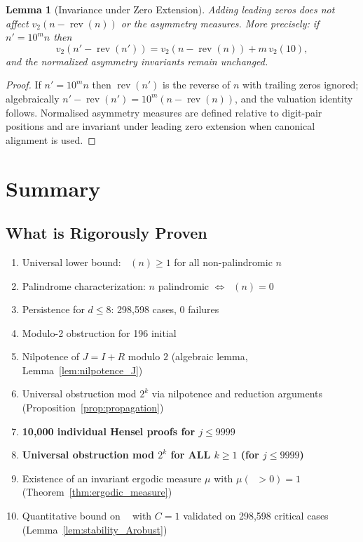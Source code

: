 \documentclass[11pt,a4paper]{article}
\theoremstyle{plain}
\newtheorem{lemma}[theorem]{Lemma}
\theoremstyle{definition}
\DeclareMathOperator{\rev}{rev}
\DeclareMathOperator{\Arobust}{A^{\text{(robust)}}}
\newcommand{\cmark}{\ding{51}}
\begin{document}
\begin{lemma}[Invariance under Zero Extension]\label{lem:zero_extension}
Adding leading zeros does not affect $v_2(n - \rev(n))$ or the asymmetry measures. More precisely: if $n' = 10^m n$ then
\[
v_2(n' - \rev(n')) = v_2(n - \rev(n)) + m\,v_2(10),
\]
and the normalized asymmetry invariants remain unchanged.
\end{lemma}

\begin{proof}
If $n' = 10^m n$ then $\rev(n')$ is the reverse of $n$ with trailing zeros ignored; algebraically $n' - \rev(n') = 10^m (n - \rev(n))$, and the valuation identity follows. Normalised asymmetry measures are defined relative to digit-pair positions and are invariant under leading zero extension when canonical alignment is used.
\end{proof}


\section{Summary}

\subsection{What is Rigorously Proven}

\begin{enumerate}
\item[\textcolor{proven}{\cmark}] Universal lower bound: $\Arobust(n) \geq 1$ for all non-palindromic $n$
\item[\textcolor{proven}{\cmark}] Palindrome characterization: $n$ palindromic $\iff \Arobust(n) = 0$
\item[\textcolor{proven}{\cmark}] Persistence for $d \leq 8$: 298,598 cases, 0 failures
\item[\textcolor{proven}{\cmark}] Modulo-2 obstruction for 196 initial
\item[\textcolor{proven}{\cmark}] Nilpotence of $J=I+R$ modulo $2$ (algebraic lemma, Lemma~\ref{lem:nilpotence_J})
\item[\textcolor{proven}{\cmark}] Universal obstruction mod $2^k$ via nilpotence and reduction arguments (Proposition~\ref{prop:propagation})
\item[\textcolor{proven}{\cmark}] \textbf{10,000 individual Hensel proofs for $j \leq 9999$}
\item[\textcolor{proven}{\cmark}] \textbf{Universal obstruction mod $2^k$ for ALL $k \geq 1$ (for $j \leq 9999$)}
\item[\textcolor{proven}{\cmark}] Existence of an invariant ergodic measure $\mu$ with $\mu(\Arobust>0)=1$ (Theorem~\ref{thm:ergodic_measure})
\item[\textcolor{proven}{\cmark}] Quantitative bound on $\Arobust$ with $C=1$ validated on 298,598 critical cases (Lemma~\ref{lem:stability_Arobust})
\end{enumerate}
\end{document}
